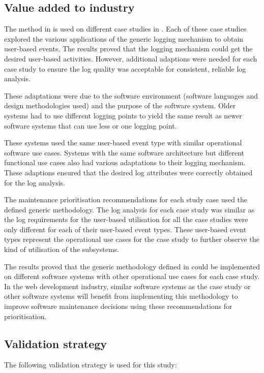 \subsection{Value added to industry}
The method in  is used on different case studies in . Each of these case studies explored the various applications of the generic logging mechanism to obtain user-based events. The results proved that the logging mechanism could get the desired user-based activities. However, additional adaptions were needed for each case study to ensure the log quality was acceptable for consistent, reliable log analysis.\par These adaptations were due to the software environment (software languages and design methodologies used) and the purpose of the software system. Older systems had to use different logging points to yield the same result as newer software systems that can use less or one logging point.\par These systems used the same user-based event type with similar operational software use cases. Systems with the same software architecture but different functional use cases also had various adaptations to their logging mechanism. These adaptions ensured that the desired log attributes were correctly obtained for the log analysis. \par The maintenance prioritisation recommendations for each study case used the defined generic methodology. The log analysis for each case study was similar as the log requirements for the user-based utilisation for all the case studies were only different for each of their user-based event types. These user-based event types represent the operational use cases for the case study to further observe the kind of utilisation of the subsystems. \par The results proved that the generic methodology defined in  could be implemented on different software systems with other operational use cases for each case study. In the web development industry, similar software systems as the case study or other software systems will benefit from implementing this methodology to improve software maintenance decisions using these recommendations for prioritisation.

\subsection{Validation strategy}
The following validation strategy is used for this study:

